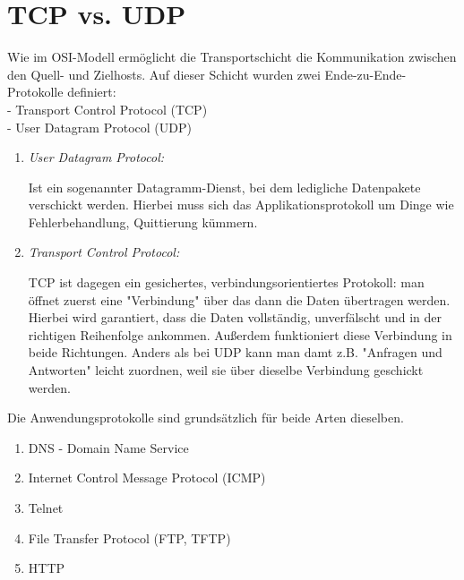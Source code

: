 \documentclass[11pt]{article}
\begin{document}
    \section{TCP vs. UDP}
    Wie im OSI-Modell ermöglicht die Transportschicht die Kommunikation
    zwischen den Quell- und Zielhosts. Auf dieser Schicht wurden zwei
    Ende-zu-Ende-Protokolle definiert:\\
    - Transport Control Protocol (TCP)\\
    - User Datagram Protocol (UDP)\\

    \begin{enumerate}
        \item \emph{User Datagram Protocol:}
        \begin{addmargin}[1em]{1em}
            Ist ein sogenannter Datagramm-Dienst, bei dem ledigliche
            Datenpakete verschickt werden. Hierbei muss sich das
            Applikationsprotokoll um Dinge wie Fehlerbehandlung, Quittierung kümmern.
        \end{addmargin}
        \item \emph{Transport Control Protocol:}
        \begin{addmargin}[1em]{1em}
            TCP ist dagegen ein gesichertes, verbindungsorientiertes Protokoll:
            man öffnet zuerst eine "Verbindung" über das dann die Daten übertragen
            werden. Hierbei wird garantiert, dass die Daten vollständig, unverfälscht
            und in der richtigen Reihenfolge ankommen.
            Außerdem funktioniert diese Verbindung in beide Richtungen.
            Anders als bei UDP kann man damt z.B. "Anfragen und Antworten" leicht zuordnen,
            weil sie über dieselbe Verbindung geschickt werden.\\

        \end{addmargin}
    \end{enumerate}

    Die Anwendungsprotokolle sind grundsätzlich für beide Arten dieselben.
    \begin{addmargin}[1em]{1em}
        \begin{enumerate}[$\diamond$]
            \item DNS - Domain Name Service
            \item Internet Control Message Protocol (ICMP)
            \item Telnet
            \item File Transfer Protocol (FTP, TFTP)
            \item HTTP
        \end{enumerate}
    \end{addmargin}
\end{document}
